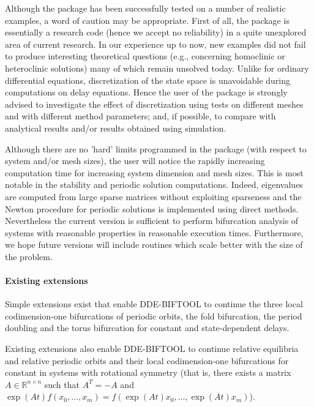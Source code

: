 \documentclass[10pt]{scrartcl}
\newcommand{\DDEBIFCODE}{\textsc{DDE-BIFTOOL}}
\newcommand{\RR}{\mathbb{R}}
\begin{document}
{Although
the package has been successfully tested on a number of realistic examples,
a word of caution may be appropriate. First of all, the package
is essentially a research code (hence we accept no
reliability) in a quite unexplored area of current
research. In our experience up to now, 
new examples did not fail to produce
interesting theoretical questions (e.g., concerning homoclinic
or heteroclinic solutions) many of which
remain unsolved today. 
Unlike for ordinary differential equations, discretization
of the state space is unavoidable during computations on
delay equations. Hence the user of the package is 
strongly advised 
to investigate the effect of discretization using tests on different
meshes and with different method parameters; and, if
possible, to compare with analytical results and/or results obtained
using simulation.

Although there are no 'hard' limits programmed in the package (with
respect to system and/or mesh sizes), the user will notice the rapidly
increasing computation time for increasing system dimension and mesh
sizes.  This is most notable in the stability and periodic solution
computations.  Indeed, eigenvalues are computed from large sparse
matrices without exploiting sparseness and the Newton procedure for
periodic solutions is implemented using direct methods.  Nevertheless
the current version is sufficient to perform bifurcation analysis of
systems with reasonable properties in reasonable execution times.
Furthermore, we hope future versions will include routines which scale
better with the size of the problem.

\paragraph{Existing extensions}
Simple extensions exist that enable \DDEBIFCODE{} to continue the
three local co\-dim\-ension-one bifurcations of periodic orbits, the fold
bifurcation, the period doubling and the torus bifurcation for
constant and state-dependent delays.

Existing extensions also enable \DDEBIFCODE{} to continue relative equilibria
and relative periodic orbits and their local codimension-one
bifurcations for constant in systems with rotational symmetry (that
is, there exists a matrix $A\in\RR^{n\times n}$ such that $A^T=-A$ and
$\exp(At)f(x_0,\ldots,x_m)=f(\exp(At)x_0,\ldots,\exp(At)x_m)$).

}
\end{document}
